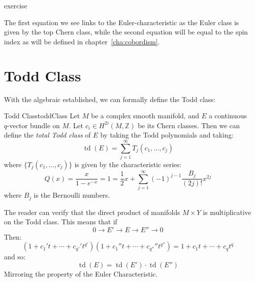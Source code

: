 \documentclass{book}
\newenvironment{Proof}[1][]
  {\begin{ProofTcb}[#1]}
  {\end{ProofTcb}}
\newcommand{\Z}{{\mathbb{Z}}}
\newcommand{\td}{{\operatorname{td}}}
\begin{document}
\begin{Proof}
  exercise
\end{Proof}
The first equation we see links to the Euler-characteristic as the Euler class is given by the top Chern class,
while the second equation will be equal to the spin index as will be defined in chapter~\ref{cha:cobordism}.
%
%
%
%

\section{Todd Class}

With the algebraic established, we can formally define the Todd class:

\begin{defn}{Todd Class}{toddClass}
  Let $M$ be a complex smooth manifold, and $E$ a continuous $q$-vector bundle on $M$. Let $c_i \in H^{2i}(M, \Z)$
  be its Chern classes. Then we can define the \emph{total Todd class} of $E$ by taking the Todd polynomials
  and taking:
  \[
    \td(E) = \sum_{j=1}^\infty T_j(c_1, ..., c_j)
  \]
  where $\{T_j(c_1, ..., c_j)\}$ is given by the characteristic series:
  \[
    Q(x) = \frac{x}{1-e^{-x}} = 1 = \frac{1}{2}x + \sum_{j=1}^\infty (-1)^{j-1} \frac{B_j}{(2j)!}x^{2j}
  \]
  where $B_j$ is the Bernoulli numbers.
\end{defn}
The reader can verify that the direct product of manifolds $M\times Y$ is multiplicative on the Todd class.
This means that if
\[
  0 \to E' \to E \to E'' \to 0
\]
Then:
\[
  (1 + c_1't + \cdots + c_{q'}'t^{q'})(1 + c_1''t + \cdots + c_{q''}''t^{q''}) =  1 + c_1t + \cdots + c_{q}t^{q}
\]
and so:
\[
  \td(E) = \td(E')\cdot \td(E'')
\]
Mirroring the property of the Euler Characteristic.
\end{document}
